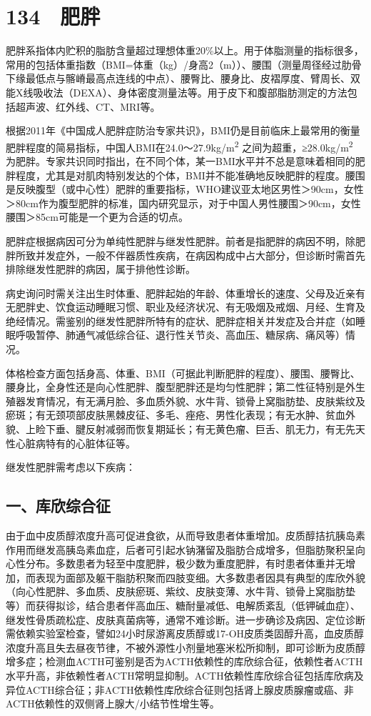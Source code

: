 \protect\hypertarget{text00314.html}{}{}

\section{134　肥胖}

肥胖系指体内贮积的脂肪含量超过理想体重20\%以上。用于体脂测量的指标很多，常用的包括体重指数（BMI=体重（kg）/身高2（m））、腰围（测量周径经过肋骨下缘最低点与髂嵴最高点连线的中点）、腰臀比、腰身比、皮褶厚度、臂周长、双能X线吸收法（DEXA）、身体密度测量法等。用于皮下和腹部脂肪测定的方法包括超声波、红外线、CT、MRI等。

根据2011年《中国成人肥胖症防治专家共识》，BMI仍是目前临床上最常用的衡量肥胖程度的简易指标，中国人BMI在24.0～27.9kg/m\textsuperscript{2}
之间为超重，≥28.0kg/m\textsuperscript{2}
为肥胖。专家共识同时指出，在不同个体，某一BMI水平并不总是意味着相同的肥胖程度，尤其是对肌肉特别发达的个体，BMI并不能准确地反映肥胖的程度。腰围是反映腹型（或中心性）肥胖的重要指标，WHO建议亚太地区男性＞90cm，女性＞80cm作为腹型肥胖的标准，国内研究显示，对于中国人男性腰围＞90cm，女性腰围＞85cm可能是一个更为合适的切点。

肥胖症根据病因可分为单纯性肥胖与继发性肥胖。前者是指肥胖的病因不明，除肥胖所致并发症外，一般不伴器质性疾病，在病因构成中占大部分，但诊断时需首先排除继发性肥胖的病因，属于排他性诊断。

病史询问时需关注出生时体重、肥胖起始的年龄、体重增长的速度、父母及近亲有无肥胖史、饮食运动睡眠习惯、职业及经济状况、有无吸烟及戒烟、月经、生育及绝经情况。需鉴别的继发性肥胖所特有的症状、肥胖症相关并发症及合并症（如睡眠呼吸暂停、肺通气减低综合征、退行性关节炎、高血压、糖尿病、痛风等）情况。

体格检查方面包括身高、体重、BMI（可据此判断肥胖的程度）、腰围、腰臀比、腰身比，全身性还是向心性肥胖、腹型肥胖还是均匀性肥胖；第二性征特别是外生殖器发育情况，有无满月脸、多血质外貌、水牛背、锁骨上窝脂肪垫、皮肤紫纹及瘀斑；有无颈项部皮肤黑棘皮征、多毛、痤疮、男性化表现；有无水肿、贫血外貌、上睑下垂、腱反射减弱而恢复期延长；有无黄色瘤、巨舌、肌无力，有无先天性心脏病特有的心脏体征等。

继发性肥胖需考虑以下疾病：

\subsection{一、库欣综合征}

由于血中皮质醇浓度升高可促进食欲，从而导致患者体重增加。皮质醇拮抗胰岛素作用而继发高胰岛素血症，后者可引起水钠潴留及脂肪合成增多，但脂肪聚积呈向心性分布。多数患者为轻至中度肥胖，极少数为重度肥胖，有时患者体重并无增加，而表现为面部及躯干脂肪积聚而四肢变细。大多数患者因具有典型的库欣外貌（向心性肥胖、多血质、皮肤瘀斑、紫纹、皮肤变薄、水牛背、锁骨上窝脂肪垫等）而获得拟诊，结合患者伴高血压、糖耐量减低、电解质紊乱（低钾碱血症）、继发性骨质疏松症、皮肤真菌病等，通常不难诊断。进一步确诊及病因、定位诊断需依赖实验室检查，譬如24小时尿游离皮质醇或17-OH皮质类固醇升高，血皮质醇浓度升高且失去昼夜节律，不被外源性小剂量地塞米松所抑制，即可诊断为皮质醇增多症；检测血ACTH可鉴别是否为ACTH依赖性的库欣综合征，依赖性者ACTH水平升高，非依赖性者ACTH常明显抑制。ACTH依赖性库欣综合征包括库欣病及异位ACTH综合征；非ACTH依赖性库欣综合征则包括肾上腺皮质腺瘤或癌、非ACTH依赖性的双侧肾上腺大/小结节性增生等。

